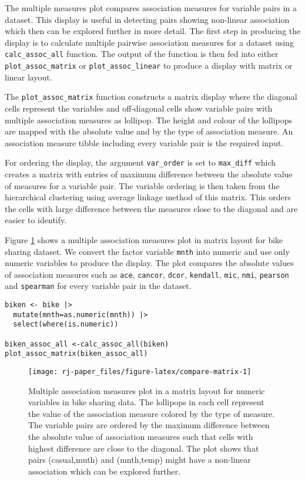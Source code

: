 The multiple measures plot compares association measures for variable pairs in a dataset. This display is useful in detecting pairs showing non-linear association which then can be explored further in more detail. The first step in producing the display is to calculate multiple pairwise association measures for a dataset using \texttt{calc\_assoc\_all} function. The output of the function is then fed into either \texttt{plot\_assoc\_matrix} or \texttt{plot\_assoc\_linear} to produce a display with matrix or linear layout.

The \texttt{plot\_assoc\_matrix} function constructs a matrix display where the diagonal cells represent the variables and off-diagonal cells show variable pairs with multiple association measures as lollipop. The height and colour of the lollipops are mapped with the absolute value and by the type of association measure. An association measure tibble including every variable pair is the required input.

For ordering the display, the argument \texttt{var\_order} is set to \texttt{max\_diff} which creates a matrix with entries of maximum difference between the absolute value of measures for a variable pair. The variable ordering is then taken from the hierarchical clustering using average linkage method of this matrix. This orders the cells with large difference between the measures close to the diagonal and are easier to identify.

Figure \ref{fig:compare-matrix} shows a multiple association measures plot in matrix layout for bike sharing dataset. We convert the factor variable \texttt{mnth} into numeric and use only numeric variables to produce the display. The plot compares the absolute values of association measures such as \texttt{ace}, \texttt{cancor}, \texttt{dcor}, \texttt{kendall}, \texttt{mic}, \texttt{nmi}, \texttt{pearson} and \texttt{spearman} for every variable pair in the dataset.

\begin{verbatim}
biken <- bike |>
  mutate(mnth=as.numeric(mnth)) |>
  select(where(is.numeric))

biken_assoc_all <-calc_assoc_all(biken)
plot_assoc_matrix(biken_assoc_all) 
\end{verbatim}

\begin{figure}

{\centering \texttt{[image: rj-paper\_files/figure-latex/compare-matrix-1]} 

}

\caption{Multiple association measures plot in a matrix layout for numeric variables in bike sharing data. The lollipops in each cell represent the value of the association measure colored by the type of measure. The variable pairs are ordered by the maximum difference between the absolute value of association measures such that cells with highest difference are close to the diagonal. The plot shows that pairs (casual,mnth) and (mnth,temp) might have a non-linear association which can be explored further.}\label{fig:compare-matrix}
\end{figure}

